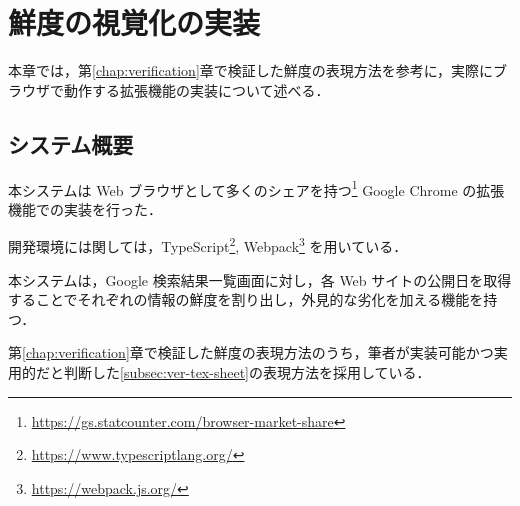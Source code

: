 \chapter{鮮度の視覚化の実装}
\label{chap:implementation}

本章では，第\ref{chap:verification}章で検証した鮮度の表現方法を参考に，実際にブラウザで動作する拡張機能の実装について述べる．

\newpage

\section{システム概要}
\label{sec:imp_system}

本システムは Web ブラウザとして多くのシェアを持つ\footnote{\url{https://gs.statcounter.com/browser-market-share}} Google Chrome の拡張機能での実装を行った．

開発環境には関しては，TypeScript\footnote{\url{https://www.typescriptlang.org/}}, Webpack\footnote{\url{https://webpack.js.org/}} を用いている．

本システムは，Google 検索結果一覧画面に対し，各 Web サイトの公開日を取得することでそれぞれの情報の鮮度を割り出し，外見的な劣化を加える機能を持つ．

第\ref{chap:verification}章で検証した鮮度の表現方法のうち，筆者が実装可能かつ実用的だと判断した\ref{subsec:ver-tex-sheet}の表現方法を採用している．

